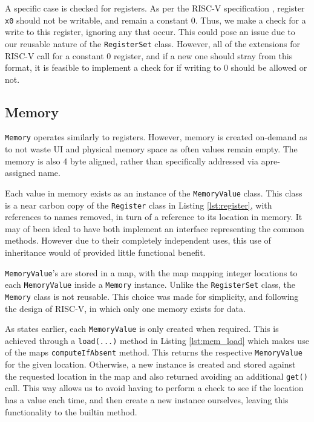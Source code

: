 A specific case is checked for registers. As per the RISC-V specification \cite{riscv_2015_riscv}, register \verb|x0| should not be writable, and remain a constant 0. Thus, we make a check for a write to this register, ignoring any that occur. This could pose an issue due to our reusable nature of the \texttt{RegisterSet} class. However, all of the extensions for RISC-V call for a constant 0 register, and if a new one should stray from this format, it is feasible to implement a check for if writing to 0 should be allowed or not.

\subsection{Memory}
\texttt{Memory} operates similarly to registers. However, memory is created on-demand as to not waste \ac{UI} and physical memory space as often values remain empty. The memory is also 4 byte aligned, rather than specifically addressed via apre-assigned name.

Each value in memory exists as an instance of the \texttt{MemoryValue} class. This class is a near carbon copy of the \texttt{Register} class in Listing \ref{lst:register}, with references to names removed, in turn of a reference to its location in memory. It may of been ideal to have both implement an interface representing the common methods. However due to their completely independent uses, this use of inheritance would of provided little functional benefit.

\texttt{MemoryValue}'s are stored in a map, with the map mapping integer locations to each \texttt{MemoryValue} inside a \texttt{Memory} instance. Unlike the \texttt{RegisterSet} class, the \texttt{Memory} class is not reusable. This choice was made for simplicity, and following the design of RISC-V, in which only one memory exists for data. 

As states earlier, each \texttt{MemoryValue} is only created when required. This is achieved through a \texttt{load(...)} method in Listing \ref{lst:mem_load} which makes use of the maps \texttt{computeIfAbsent} method. This returns the respective \texttt{MemoryValue} for the given location. Otherwise, a new instance is created and stored against the requested location in the map and also returned avoiding an additional \texttt{get()} call. This way allows us to avoid having to perform a check to see if the location has a value each time, and then create a new instance ourselves, leaving this functionality to the builtin method.

